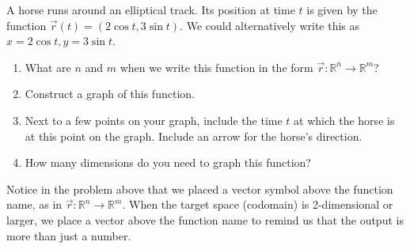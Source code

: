 \begin{problem}\label{parametric curve in plane example}%
%
A horse runs around an elliptical track. Its position at time $t$ is given by the  function $\vec r(t)=(2\cos t, 3\sin t).$ We could alternatively write this as $x=2\cos t, y=3\sin t$. 
 \begin{enumerate}
  \item What are $n$ and $m$ when we write this function in the form  $\vec r\colon {\mathbb{R}}^n\to {\mathbb{R}}^m$?
  \item Construct a graph of this function. 
  \item Next to a few points on your graph, include the time $t$ at which the horse is at this point on the graph. Include an arrow for the horse's direction.
  \item How many dimensions do you need to graph this function?
 \end{enumerate}
\end{problem}


Notice in the problem above that we placed a vector symbol above the function name, as in $\vec r\colon {\mathbb{R}}^n\to {\mathbb{R}}^m$.  When the target space (codomain) is 2-dimensional or larger, we place a vector above the function name to remind us that the output is more than just a number.

